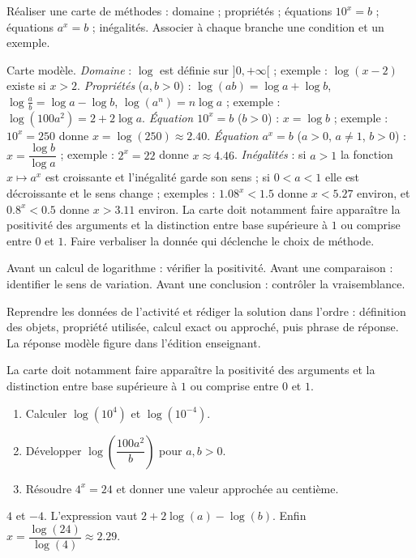 \begin{activity}
Réaliser une carte de méthodes : domaine ; propriétés ; équations $10^x=b$ ; équations $a^x=b$ ; inégalités. Associer à chaque branche une condition et un exemple.

\end{activity}
\begin{solution}Carte modèle. \emph{Domaine} : $\log$ est définie sur $]0,+\infty[$ ; exemple : $\log(x-2)$ existe si $x>2$. \emph{Propriétés} ($a,b>0$) : $\log(ab)=\log a+\log b$, $\log\frac ab=\log a-\log b$, $\log(a^n)=n\log a$ ; exemple : $\log(100a^2)=2+2\log a$. \emph{Équation $10^x=b$} ($b>0$) : $x=\log b$ ; exemple : $10^x=250$ donne $x=\log(250)\approx\num{2,40}$. \emph{Équation $a^x=b$} ($a>0$, $a\neq1$, $b>0$) : $x=\dfrac{\log b}{\log a}$ ; exemple : $2^x=22$ donne $x\approx\num{4,46}$. \emph{Inégalités} : si $a>1$ la fonction $x\mapsto a^x$ est croissante et l'inégalité garde son sens ; si $0<a<1$ elle est décroissante et le sens change ; exemples : $\num{1,08}^x<\num{1,5}$ donne $x<\num{5,27}$ environ, et $\num{0,8}^x<\num{0,5}$ donne $x>\num{3,11}$ environ. La carte doit notamment faire apparaître la positivité des arguments et la distinction entre base supérieure à $1$ ou comprise entre $0$ et $1$. Faire verbaliser la donnée qui déclenche le choix de méthode.\end{solution}

\begin{summary}Avant un calcul de logarithme : vérifier la positivité. Avant une comparaison : identifier le sens de variation. Avant une conclusion : contrôler la vraisemblance.\end{summary}

\begin{example}
Reprendre les données de l'activité et rédiger la solution dans l'ordre : définition des objets, propriété utilisée, calcul exact ou approché, puis phrase de réponse. La réponse modèle figure dans l'édition enseignant.
\end{example}
\begin{solution}La carte doit notamment faire apparaître la positivité des arguments et la distinction entre base supérieure à $1$ ou comprise entre $0$ et $1$.\end{solution}

\begin{exercise}[essentiel]
\begin{enumerate}\item Calculer $\log(10^4)$ et $\log(10^{-4})$.\item Développer $\log\!\left(\dfrac{100a^2}{b}\right)$ pour $a,b>0$.\item Résoudre $4^x=24$ et donner une valeur approchée au centième.\end{enumerate}
\end{exercise}
\begin{solution}$4$ et $-4$. L'expression vaut $2+2\log(a)-\log(b)$. Enfin $x=\dfrac{\log(24)}{\log(4)}\approx\num{2,29}$.\end{solution}

